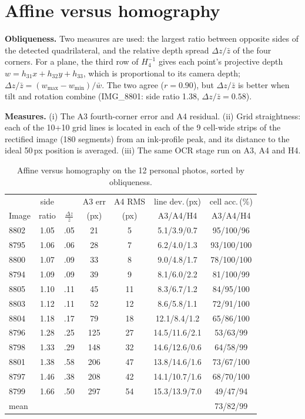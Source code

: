 \documentclass[conference]{IEEEtran}
\begin{document}
\section{Affine versus homography}
\textbf{Obliqueness.} Two measures are used: the largest ratio between opposite sides of the
detected quadrilateral, and the relative depth spread $\Delta z/\bar z$ of the four corners. For
a plane, the third row of $H_4^{-1}$ gives each point's projective depth $w = h_{31}x + h_{32}y +
h_{33}$, which is proportional to its camera depth; $\Delta z/\bar z = (w_{\max}-w_{\min})/\bar
w$. The two agree ($r=0.90$), but $\Delta z/\bar z$ is better when tilt and rotation combine
(IMG\_8801: side ratio 1.38, $\Delta z/\bar z = 0.58$).

\textbf{Measures.} (i) The A3 fourth-corner error and A4 residual. (ii) Grid straightness: each
of the 10+10 grid lines is located in each of the 9 cell-wide strips of the rectified image
(180 segments) from an ink-profile peak, and its distance to the ideal 50\,px position is
averaged. (iii) The same OCR stage run on A3, A4 and H4.

\begin{table}[t]
\centering
\caption{Affine versus homography on the 12 personal photos, sorted by obliqueness.}
\label{tab:stage4}
\setlength{\tabcolsep}{3pt}
\footnotesize
\begin{tabular}{@{}lcccccc@{}}
\toprule
 & side & & A3 err & A4 RMS & line dev.\,(px) & cell acc.\,(\%)\\
Image & ratio & $\frac{\Delta z}{\bar z}$ & (px) & (px) & A3/A4/H4 & A3/A4/H4\\
\midrule
8802 & 1.05 & .05 & 21 & 5 & 5.1/3.9/0.7 & 95/100/96\\
8795 & 1.06 & .06 & 28 & 7 & 6.2/4.0/1.3 & 93/100/100\\
8800 & 1.07 & .09 & 33 & 8 & 9.0/4.8/1.7 & 78/100/100\\
8794 & 1.09 & .09 & 39 & 9 & 8.1/6.0/2.2 & 81/100/99\\
8805 & 1.10 & .11 & 45 & 11 & 8.3/6.7/1.2 & 84/95/100\\
8803 & 1.12 & .11 & 52 & 12 & 8.6/5.8/1.1 & 72/91/100\\
8804 & 1.18 & .17 & 79 & 18 & 12.1/8.4/1.2 & 65/86/100\\
8796 & 1.28 & .25 & 125 & 27 & 14.5/11.6/2.1 & 53/63/99\\
8798 & 1.33 & .29 & 148 & 32 & 14.6/12.6/0.6 & 64/58/99\\
8801 & 1.38 & .58 & 206 & 47 & 13.8/14.6/1.6 & 73/67/100\\
8797 & 1.46 & .38 & 208 & 42 & 14.1/10.7/1.6 & 68/70/100\\
8799 & 1.66 & .50 & 297 & 54 & 15.3/13.9/7.0 & 49/47/94\\
\midrule
mean & & & & & & 73/82/99\\
\bottomrule
\end{tabular}
\end{table}
\end{document}
